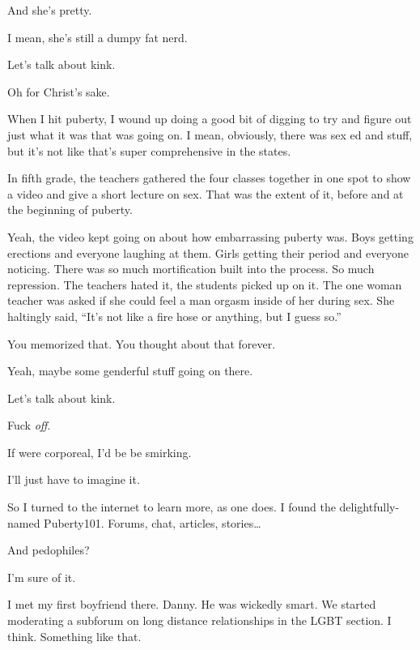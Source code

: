 \begin{paracol}{2}
\begin{leftcolumn}
\begin{ally}
And she's pretty.
\end{ally}
I mean, she's still a dumpy fat nerd.

\begin{ally}
Let's talk about kink.
\end{ally}
Oh for Christ's sake.
\newpage

\noindent When I hit puberty, I wound up doing a good bit of digging to try and figure out just what it was that was going on. I mean, obviously, there was sex ed and stuff, but it's not like that's super comprehensive in the states.

\begin{ally}
In fifth grade, the teachers gathered the four classes together in one spot to show a video and give a short lecture on sex. That was the extent of it, before and at the beginning of puberty.
\end{ally}
Yeah, the video kept going on about how embarrassing puberty was. Boys getting erections and everyone laughing at them. Girls getting their period and everyone noticing. There was so much mortification built into the process. So much repression. The teachers hated it, the students picked up on it. The one woman teacher was asked if she could feel a man orgasm inside of her during sex. She haltingly said, ``It's not like a fire hose or anything, but I guess so.''

\begin{ally}
You memorized that. You thought about that forever.
\end{ally}
Yeah, maybe some genderful stuff going on there.

\begin{ally}
Let's talk about kink.
\end{ally}
Fuck \emph{off}.

\begin{ally}
If were corporeal, I'd be be smirking.
\end{ally}
I'll just have to imagine it.

So I turned to the internet to learn more, as one does. I found the delightfully-named Puberty101. Forums, chat, articles, stories\ldots{}

\begin{ally}
And pedophiles?
\end{ally}
I'm sure of it.

I met my first boyfriend there. Danny. He was wickedly smart. We started moderating a subforum on long distance relationships in the LGBT section. I think. Something like that.


\end{leftcolumn}
\end{paracol}
